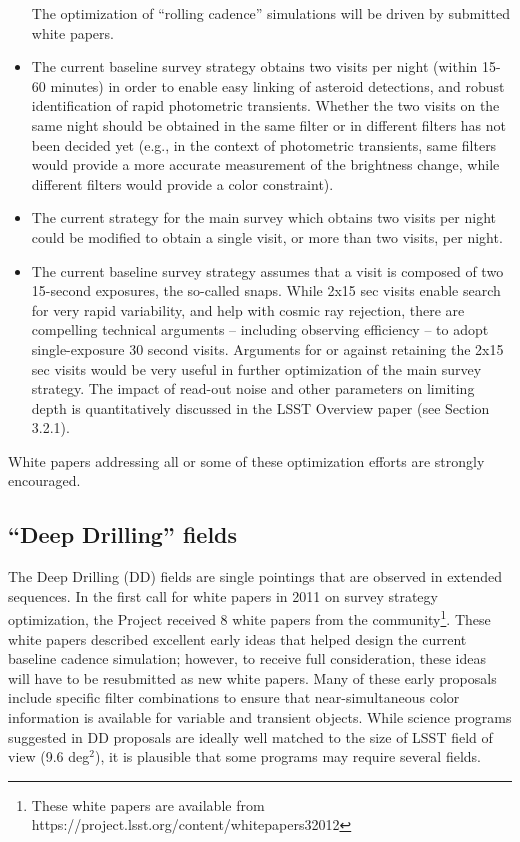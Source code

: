 \documentclass[DM,lsstdraft,toc,usenatbib]{lsstdoc}
\begin{document}
\begin{itemize}
The optimization of ``rolling cadence'' simulations will be driven by submitted white papers. 
\item The current baseline survey strategy obtains two visits per night (within 15-60 minutes) in 
order to enable easy linking of asteroid detections, and robust identification of rapid 
photometric transients. Whether the two visits on the same night should be obtained 
in the same filter or in different filters has not been decided yet (e.g., in the context
of photometric transients, same filters would provide a more accurate measurement
of the brightness change, while different filters would provide a color constraint). 
\item The current strategy for the main survey which obtains two visits per night could be 
modified to obtain a single visit, or more than two visits, per night. 
\item The current baseline survey strategy assumes that a visit is composed of two 15-second
exposures, the so-called snaps. While 2x15 sec visits enable search for very rapid variability,
and help with cosmic ray rejection, there are compelling technical arguments -- including observing efficiency -- 
to adopt single-exposure 30 second visits. Arguments for or against retaining the 2x15 sec visits 
would be very useful in further optimization of the main survey strategy. 
The impact of read-out noise and other parameters on limiting depth is quantitatively
discussed in the LSST Overview paper (see Section 3.2.1). 
\end{itemize}
White papers addressing all or some of these optimization efforts are strongly encouraged.


\subsection{``Deep Drilling'' fields} 

The Deep Drilling (DD) fields are single pointings that are observed in extended sequences. 
In the first call for white papers in 2011 on survey strategy optimization, the Project received 
8 white papers from the community\footnote{These white papers are available from 
https://project.lsst.org/content/whitepapers32012}. 
These white papers described excellent early ideas that helped design the current baseline 
cadence simulation; however, to receive full consideration, these ideas will have to be 
resubmitted as new white papers. Many of these early proposals include specific 
filter combinations to ensure that near-simultaneous color information is available for 
variable and transient objects. While science programs suggested in DD proposals are ideally well 
matched to the size of LSST field of view (9.6 deg$^2$), it is plausible that some
programs may require several fields. 
\end{document}

